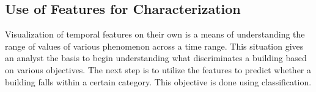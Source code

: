 \subsection{Use of Features for Characterization}
\label{sec:feature_use}

Visualization of temporal features on their own is a means of understanding the range of values of various phenomenon across a time range. This situation gives an analyst the basis to begin understanding what discriminates a building based on various objectives. The next step is to utilize the features to predict whether a building falls within a certain category. This objective is done using classification.